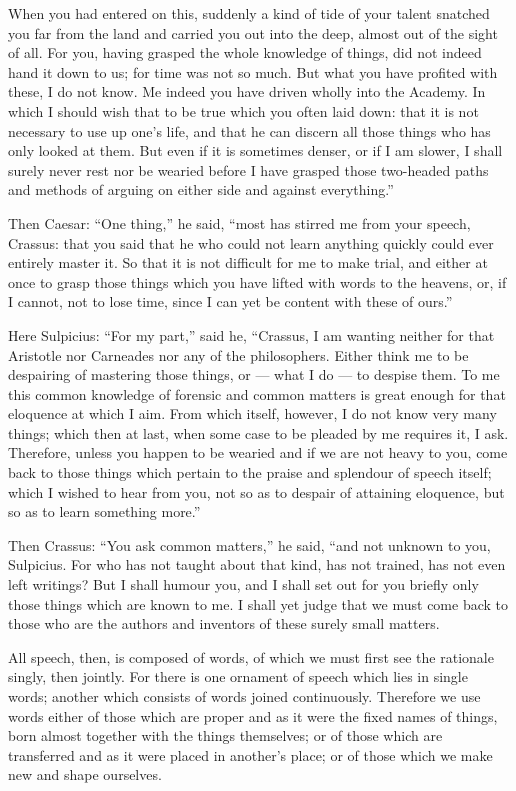  When you had entered on this, suddenly a kind of tide of your talent snatched you far from the land and carried you out into the deep, almost out of the sight of all. For you, having grasped the whole knowledge of things, did not indeed hand it down to us; for time was not so much. But what you have profited with these, I do not know. Me indeed you have driven wholly into the Academy. In which I should wish that to be true which you often laid down: that it is not necessary to use up one's life, and that he can discern all those things who has only looked at them. But even if it is sometimes denser, or if I am slower, I shall surely never rest nor be wearied before I have grasped those two-headed paths and methods of arguing on either side and against everything.''

 Then Caesar: ``One thing,'' he said, ``most has stirred me from your speech, Crassus: that you said that he who could not learn anything quickly could ever entirely master it. So that it is not difficult for me to make trial, and either at once to grasp those things which you have lifted with words to the heavens, or, if I cannot, not to lose time, since I can yet be content with these of ours.''

 Here Sulpicius: ``For my part,'' said he, ``Crassus, I am wanting neither for that Aristotle nor Carneades nor any of the philosophers. Either think me to be despairing of mastering those things, or — what I do — to despise them. To me this common knowledge of forensic and common matters is great enough for that eloquence at which I aim. From which itself, however, I do not know very many things; which then at last, when some case to be pleaded by me requires it, I ask. Therefore, unless you happen to be wearied and if we are not heavy to you, come back to those things which pertain to the praise and splendour of speech itself; which I wished to hear from you, not so as to despair of attaining eloquence, but so as to learn something more.''

 Then Crassus: ``You ask common matters,'' he said, ``and not unknown to you, Sulpicius. For who has not taught about that kind, has not trained, has not even left writings? But I shall humour you, and I shall set out for you briefly only those things which are known to me. I shall yet judge that we must come back to those who are the authors and inventors of these surely small matters.

 All speech, then, is composed of words, of which we must first see the rationale singly, then jointly. For there is one ornament of speech which lies in single words; another which consists of words joined continuously. Therefore we use words either of those which are proper and as it were the fixed names of things, born almost together with the things themselves; or of those which are transferred and as it were placed in another's place; or of those which we make new and shape ourselves.

